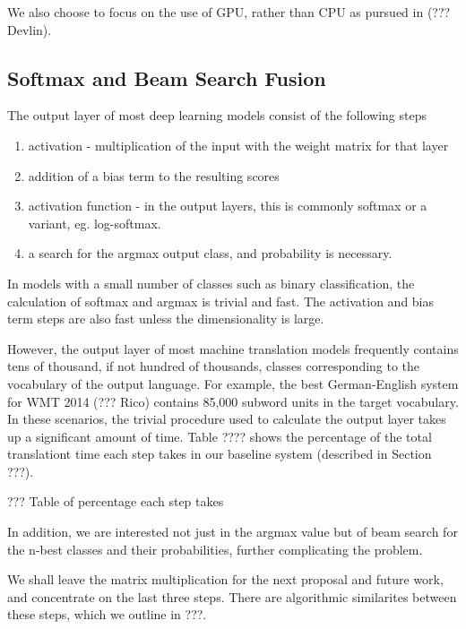 \documentclass[]{article}
\begin{document}
We also choose to focus on the use of GPU, rather than CPU as pursued in (??? Devlin).

\subsection{Softmax and Beam Search Fusion}

The output layer of most deep learning models consist of the following steps
\begin{enumerate}
   \item \vspace{-2 mm} activation - multiplication of the input with the weight matrix for that layer
   \item \vspace{-2 mm} addition of a bias term to the resulting scores
   \item \vspace{-2 mm} activation function - in the output layers, this is commonly softmax or a variant, eg. log-softmax.
   \item \vspace{-2 mm} a search for the argmax output class, and probability is necessary.
\end{enumerate}

In models with a small number of classes such as binary classification, the calculation of softmax and argmax is trivial and fast. The activation and bias term steps are also fast unless the dimensionality is large.

However, the output layer of most machine translation models frequently contains tens of thousand, if not hundred of thousands, classes corresponding to the vocabulary of the output language. For example, the best German-English system for WMT 2014 (??? Rico) contains 85,000 subword units in the target vocabulary. In these scenarios, the trivial procedure used to calculate the output layer takes up a significant amount of time. Table ???? shows the percentage of the total translationt time each step takes in our baseline system (described in Section ???).

??? Table of percentage each step takes

In addition, we are interested not just in the argmax value but of beam search for the n-best classes and their probabilities, further complicating the problem.

We shall leave the matrix multiplication for the next proposal and future work, and concentrate on the last three steps. There are algorithmic similarites between these steps, which we outline in ???.
\end{document}
